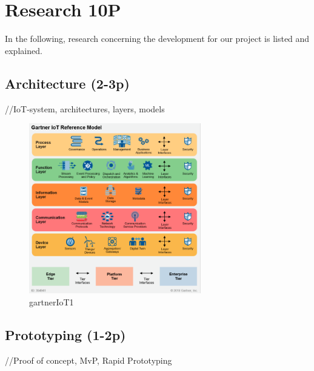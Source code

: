 
\chapter{Research 10P} %

\label{Chapter2} %
In the following, research concerning the development for our project is listed and explained.
\section{Architecture (2-3p)}
//IoT-system, architectures, layers, models 
\begin{figure}[th]
	\centering
	\includegraphics[width=75mm,scale=0.75]{Figures/gartnerIoT}
	\decoRule
	\caption[Gartner]{gartnerIoT1}
	\label{fig:gartnerIoT}
\end{figure}
\section{Prototyping (1-2p)}
//Proof of concept, MvP, Rapid Prototyping
